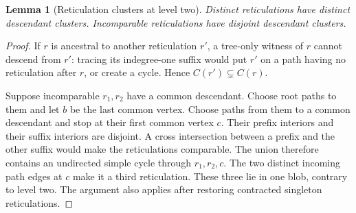\documentclass[11pt]{article}
\newtheorem{lemma}[theorem]{Lemma}
\begin{document}
\begin{lemma}[Reticulation clusters at level two]
\label{lem:retic-clusters}
Distinct reticulations have distinct descendant clusters.  Incomparable
reticulations have disjoint descendant clusters.
\end{lemma}
\begin{proof}
If $r$ is ancestral to another reticulation $r'$, a tree-only witness of $r$
cannot descend from $r'$: tracing its indegree-one suffix would put $r'$ on
a path having no reticulation after $r$, or create a cycle.  Hence
$C(r')\subsetneq C(r)$.

Suppose incomparable $r_1,r_2$ have a common descendant.  Choose root paths
to them and let $b$ be the last common vertex.  Choose paths from them to a
common descendant and stop at their first common vertex $c$.  Their prefix
interiors and their suffix interiors are disjoint.  A cross intersection
between a prefix and the other suffix would make the reticulations
comparable.  The union therefore contains an undirected simple cycle
through $r_1,r_2,c$.  The two distinct incoming path edges at $c$ make it a
third reticulation.  These three lie in one blob, contrary to level two.
The argument also applies after restoring contracted singleton reticulations.
\end{proof}
\end{document}
